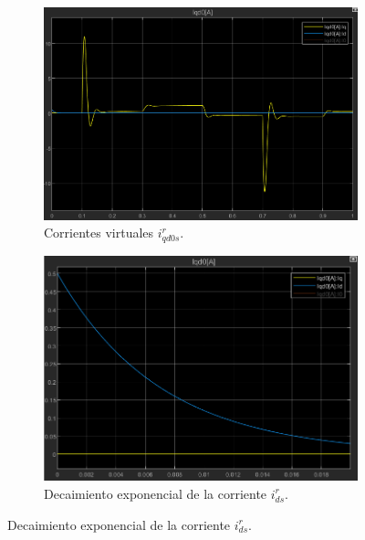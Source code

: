 \documentclass{article}
\begin{document}
\begin{figure}[H]
    \centering
    \begin{subfigure}[b]{0.42\textwidth}
        \centering
        \includegraphics[width=\textwidth]{Imagenes/CorrientesVirtualesId0,5A.png}
        \caption{Corrientes virtuales \(i^r_{qd0s}\).}
        \label{fig:CorrientesVirtualesId0.5A}
    \end{subfigure}
    \hfill
    \begin{subfigure}[b]{0.4\textwidth}
        \centering
        \includegraphics[width=\textwidth]{Imagenes/DecaimientoCorrienteId0,5A.png}
        \caption{Decaimiento exponencial de la corriente \(i^r_{ds}\).}
        \label{fig:DecaimientoCorrienteId0.5A}
    \end{subfigure}
    

\end{figure}
\end{document}
